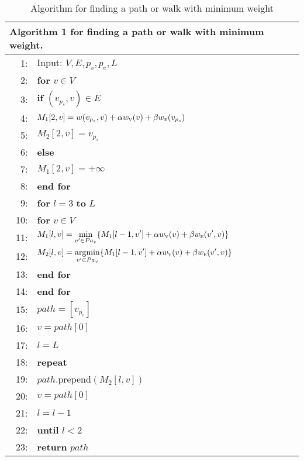\begin{table}
\centering
\small
\begin{tabular}{rl}
\hline
\multicolumn{2}{l}{\textbf{Algorithm 1} for finding a path or walk with minimum weight.} \\
\hline
 1:& Input: $V, E, p_s, p_e, L$ \\
 2:&\textbf{for} $v \in V$ \\
 3:&\hspace{6pt}\textbf{if} $(v_{p_s}, v) \in E$ \\
 4:&\hspace{12pt}   $M_1[2, v] = w(v_{p_s}, v) + \alpha w_{\textsc{v}}(v) + \beta w_{\textsc{e}}(v_{p_s})$ \\
 5:&\hspace{12pt}   $M_2[2, v] = v_{p_s}$ \\
 6:&\hspace{6pt}\textbf{else} \\
 7:&\hspace{12pt}   $M_1[2, v] = +\infty$ \\
 8:&\textbf{end for} \\
 9:&\textbf{for} $l=3$ \textbf{to} $L$ \\
10:&\hspace{6pt}\textbf{for} $v \in V$ \\
11:&\hspace{12pt}   \(\displaystyle M_1[l, v] = \min_{v' \in Pa_v} \{ M_1[l-1, v'] +
                                                \alpha w_{\textsc{v}}(v) + \beta w_{\textsc{e}}(v', v) \} \) \\
12:&\hspace{12pt}   \(\displaystyle M_2[l, v] = \operatorname*{argmin}_{v' \in Pa_v} \{ M_1[l-1, v'] +
                                                \alpha w_{\textsc{v}}(v) + \beta w_{\textsc{e}}(v', v) \} \)\\
13:&\hspace{6pt}\textbf{end for} \\
14:&\textbf{end for} \\
15:&$path = [v_{p_e}]$ \\
16:&$v = path[0]$ \\
17:&$l = L$ \\
18:&\textbf{repeat} \\
19:&\hspace{6pt}$path$.prepend$(M_2[l, v])$ \\
20:&\hspace{6pt}$v = path[0]$ \\
21:&\hspace{6pt}$l = l - 1$ \\
22:&\textbf{until} $l < 2$ \\
23:&\textbf{return} $path$ \\
\hline
\end{tabular}
    \caption{Algorithm for finding a path or walk with minimum weight}
\label{algo:dp}
\end{table}


